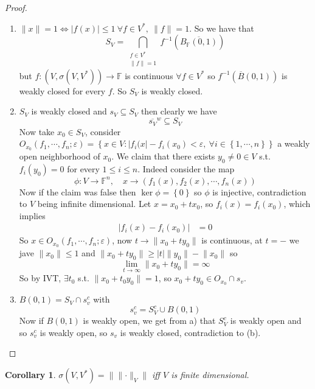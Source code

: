 \documentclass[11pt,a4paper]{article}
\theoremstyle{definition}
\theoremstyle{plain}
\newtheorem{corollary}[definition]{Corollary}
\theoremstyle{remark}
\newcommand{\F}{\mathbb{F}}
\renewcommand{\set}[1]{\left\{ #1 \right\}}
\newcommand{\abs}[1]{\lvert #1 \rvert}
\newcommand{\norm}[1]{\lVert #1 \rVert}
\newcommand{\1}{\mathbbm{1}}
\begin{document}
\begin{proof}
    \begin{enumerate}[label = \alph*)]
        \item $\norm{x} = 1 \iff \abs{f(x)} \le 1 \ \forall f \in V^*, \ \norm{f} = 1$.  So we have that 
        $$S_V = \bigcap_{\substack{f \in V^* \\ \norm{f} = 1}} f^{-1} \left(\overline{B_\F (0,1)}\right)$$
        but $f \colon (V, \sigma(V, V^*)) \to \F$ is continuous $\forall f \in V^*$ so $f^{-1}(\overline{B}(0,1))$ is weakly closed for every $f$. 
        So $S_V$ is weakly closed.

        \item $S_V$ is weakly closed and $s_V \subseteq S_V$ then clearly we have
        $$\overline{s_V}^w \subseteq S_V$$
        Now take $x_0 \in S_V$, consider $O_{x_0} (f_1, \cdots, f_n; \varepsilon) = \set{x \in V \colon \abs{f_i(x} - f_i(x_0) < \varepsilon, \ \forall i \in \set{1, \cdots, n}}$ a weakly open neighborhood of $x_0$. 
        We claim that there exists $y_0 \ne 0 \in V$ s.t. $f_i(y_0) = 0$ for every $1 \le i \le n$. Indeed consider the map 
        $$\phi \colon V \to \F^n, \quad x \to (f_1(x), f_2(x), \cdots, f_n(x))$$
        Now if the claim was false then $\ker \phi = \set{0}$ so $\phi$ is injective, contradiction to $V$ being infinite dimensional. 
        Let $x = x_0 + t x_0$, so $f_i(x) = f_i(x_0)$, which implies 
        \begin{align*}
            \abs{f_i(x) - f_i(x_0)} &= 0 
        \end{align*}
        So $x \in O_{x_0}( f_1, \cdots, f_n; \varepsilon)$, now $t \to \norm{x_0 + t y_0}$ is continuous, at $t = -$ we jave 
        $\norm{x_0} \le 1$ and $\norm{x_0 + t y_0} \ge \abs{t} \norm{y_0} - \norm{x_0}$ so 
        $$\lim_{t \to \infty} \norm{x_0 + t y_0} = \infty$$
        So by IVT, $\exists t_0$ s.t. $\norm{x_0 + t_0 y_0} = 1$, so $x_0 + t y_0 \in O_{x_0} \cap s_v$.

        \item $B(0, 1) = S_V \cap s_v^c$ with 
        $$s_v^c = S_V^c \cup B(0,1)$$
        Now if $B(0,1)$ is weakly open, we get from a) that $S_V^c$ is weakly open and so $s_v^c$ is weakly open, so $s_v$ is weakly closed, contradiction to (b). 
    \end{enumerate}
\end{proof}

\begin{corollary}
    $\sigma(V, V^*) = \norm{\norm{\cdot}_V}$ iff $V$ is finite dimensional.
\end{corollary}
\end{document}
